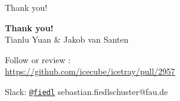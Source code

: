 
\placelogotrue
\begin{frame}{Thank you!}
  \begin{center}
    \textbf{Thank you!} \\
    {\Huge Tianlu Yuan \& Jakob van Santen \\ \vspace{1cm}}
    
    Follow or review : \\
    \url{https://github.com/icecube/icetray/pull/2957} \\ \vspace{0.1cm}
    
    Slack: \href{https://icecube-spno.slack.com/messages/@U092MBFU2}{\texttt{@fiedl}}
    sebastian.fiedlschuster@fau.de

  \end{center}
\end{frame}
\placelogofalse
